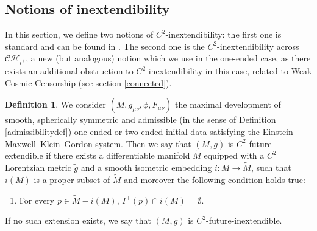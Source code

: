 \documentclass[10pt,a4paper]{article}
\theoremstyle{plain}
\theoremstyle{remark}
\theoremstyle{definition}
\newtheorem{defn}{Definition}[section]
\theoremstyle{plain}
\theoremstyle{remark}
\theoremstyle{definition}
\newcommand{\CH}{\mathcal{CH}_{i^+}}
\numberwithin{equation}{section}
\begin{document}
\subsection{Notions of inextendibility} \label{inextsection}

In this section, we define two notions of $C^2$-inextendibility: the first one is standard and can be found in \cite{JonathanStab}. The second one is the $C^2$-inextendibility across $\CH$, a new (but analogous) notion which we use in the one-ended case, as there exists an additional obstruction to $C^2$-inextendibility in this case, related to Weak Cosmic Censorship (see section \ref{connected}).

\begin{defn} \label{generalinext} We consider $(M,g_{\mu \nu}, \phi,F_{\mu \nu})$ the maximal development of smooth, spherically symmetric and admissible (in the sense of Definition \ref{admissibilitydef}) one-ended or two-ended initial data satisfying the Einstein--Maxwell--Klein--Gordon system. 
	Then we say that $(M,g)$ is $C^2$-future-extendible if there exists a differentiable manifold $\tilde{M}$ equipped with a $C^2$ Lorentzian metric $\tilde{g}$ and a smooth isometric embedding $i: M \rightarrow  \tilde{M}$, such that $i(M)$ is a proper subset of $\tilde{M}$ and moreover the following condition holds true: \begin{enumerate}
		\item For every $p \in \tilde{M}-i(M)$, $I^+(p) \cap i(M) = \emptyset$.
		
	\end{enumerate} 
	
	
	
	If no such extension exists, we say that $(M,g)$ is $C^2$-future-inextendible.
\end{defn}
\end{document}
